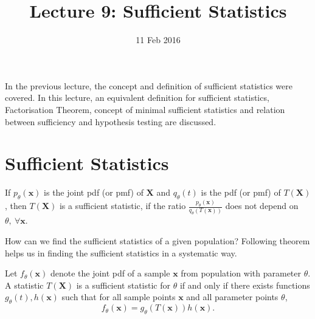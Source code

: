 \documentclass[a4paper,english,12pt]{article}
\title{Lecture 9: Sufficient Statistics}
\date{11 Feb 2016}
\author{}
\newcommand{\bx}{\mathbf{x}}
\newcommand{\bX}{\mathbf{X}}
\begin{document}
\maketitle
In the previous lecture, the concept and definition of sufficient statistics were covered. In this lecture, an equivalent definition for sufficient statistics, Factorisation Theorem, concept of minimal sufficient statistics and relation between sufficiency and hypothesis testing are discussed.
\section{Sufficient Statistics}

\begin{defn} 
If $p_\theta(\bx)$ is the joint pdf (or pmf) of $\bX$ and $q_\theta(t)$ is the pdf (or pmf) of $T(\bX)$, then $T(\bX)$ is a sufficient statistic, if the ratio $\frac{p_\theta (\bx)}{q_\theta (T(\bx))}$ does not depend on $\theta,~ \forall \bx $.
\end{defn}

How can we find the sufficient statistics of a given population? Following theorem helps us in finding the sufficient statistics in a systematic way.

\begin{thm}
 Let $f_\theta (\bx)$ denote the joint pdf of a sample $\bx$ from population with parameter $\theta$. A statistic $T(\bX)$ is a sufficient statistic for $\theta$ if and only if there exists functions $g_\theta (t), h(\bx)$ such that for all sample points $\bx$ and all parameter points $\theta$, 
\begin{equation}	\label{eq:thm1}
f_\theta(\bx)=g_\theta(T(\bx))h(\bx). 
\end{equation}
\end{thm}
\end{document}
